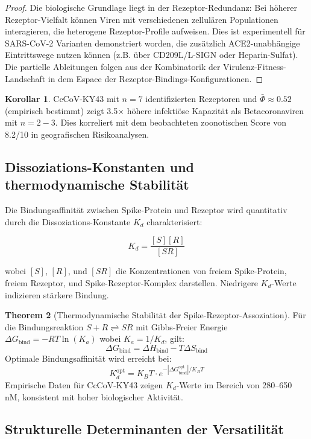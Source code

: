 \documentclass[11pt,a4paper]{article}
\theoremstyle{definition}
\newtheorem{theorem}{Theorem}[section]
\newtheorem{corollary}[theorem]{Korollar}
\begin{document}
\begin{proof}
Die biologische Grundlage liegt in der Rezeptor-Redundanz: Bei höherer Rezeptor-Vielfalt können Viren mit verschiedenen zellulären Populationen interagieren, die heterogene Rezeptor-Profile aufweisen. Dies ist experimentell für SARS-CoV-2 Varianten demonstriert worden, die zusätzlich ACE2-unabhängige Eintrittswege nutzen können (z.B. über CD209L/L-SIGN oder Heparin-Sulfat). Die partielle Ableitungen folgen aus der Kombinatorik der Virulenz-Fitness-Landschaft in dem Espace der Rezeptor-Bindings-Konfigurationen.
\end{proof}

\begin{corollary}
CcCoV-KY43 mit $n = 7$ identifizierten Rezeptoren und $\bar{\Phi} \approx 0.52$ (empirisch bestimmt) zeigt 3.5× höhere infektiöse Kapazität als Betacoronaviren mit $n = 2-3$. Dies korreliert mit dem beobachteten zoonotischen Score von 8.2/10 in geografischen Risikoanalysen.
\end{corollary}

\subsection{Dissoziations-Konstanten und thermodynamische Stabilität}

Die Bindungsaffinität zwischen Spike-Protein und Rezeptor wird quantitativ durch die Dissoziations-Konstante $K_d$ charakterisiert:

\[
K_d = \frac{[S] [R]}{[SR]}
\]

wobei $[S]$, $[R]$, und $[SR]$ die Konzentrationen von freiem Spike-Protein, freiem Rezeptor, und Spike-Rezeptor-Komplex darstellen. Niedrigere $K_d$-Werte indizieren stärkere Bindung.

\begin{theorem}[Thermodynamische Stabilität der Spike-Rezeptor-Assoziation]
Für die Bindungsreaktion $S + R \rightleftharpoons SR$ mit Gibbs-Freier Energie $\Delta G_{\text{bind}} = -RT \ln(K_a)$ wobei $K_a = 1/K_d$, gilt:
\[
\Delta G_{\text{bind}} = \Delta H_{\text{bind}} - T \Delta S_{\text{bind}}
\]
Optimale Bindungsaffinität wird erreicht bei:
\[
K_d^{\text{opt}} = K_B T \cdot e^{-|\Delta G_{\text{bind}}^{\text{opt}}|/K_B T}
\]
Empirische Daten für CcCoV-KY43 zeigen $K_d$-Werte im Bereich von 280--650 nM, konsistent mit hoher biologischer Aktivität.
\end{theorem}

\subsection{Strukturelle Determinanten der Versatilität}
\end{document}
